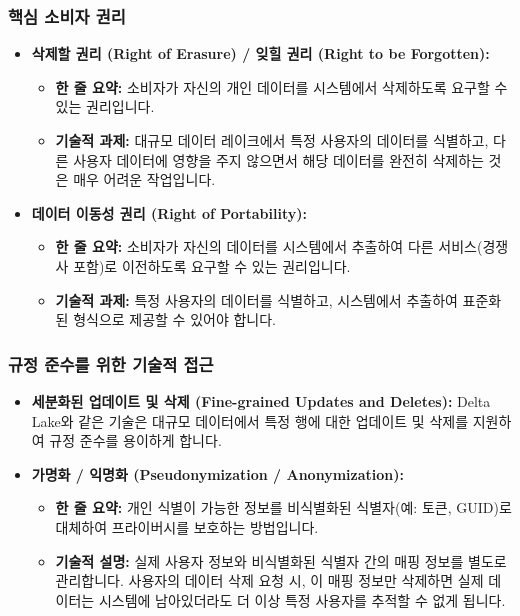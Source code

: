 \documentclass[11pt,a4paper]{article}
\theoremstyle{definition}
\begin{document}
\subsubsection{핵심 소비자 권리}
\begin{itemize}
    \item \textbf{삭제할 권리 (Right of Erasure) / 잊힐 권리 (Right to be Forgotten):}
    \begin{itemize}
        \item \textbf{한 줄 요약:} 소비자가 자신의 개인 데이터를 시스템에서 삭제하도록 요구할 수 있는 권리입니다.
        \item \textbf{기술적 과제:} 대규모 데이터 레이크에서 특정 사용자의 데이터를 식별하고, 다른 사용자 데이터에 영향을 주지 않으면서 해당 데이터를 완전히 삭제하는 것은 매우 어려운 작업입니다.
    \end{itemize}
    \item \textbf{데이터 이동성 권리 (Right of Portability):}
    \begin{itemize}
        \item \textbf{한 줄 요약:} 소비자가 자신의 데이터를 시스템에서 추출하여 다른 서비스(경쟁사 포함)로 이전하도록 요구할 수 있는 권리입니다.
        \item \textbf{기술적 과제:} 특정 사용자의 데이터를 식별하고, 시스템에서 추출하여 표준화된 형식으로 제공할 수 있어야 합니다.
    \end{itemize}
\end{itemize}

\subsubsection{규정 준수를 위한 기술적 접근}
\begin{itemize}
    \item \textbf{세분화된 업데이트 및 삭제 (Fine-grained Updates and Deletes):} Delta Lake와 같은 기술은 대규모 데이터에서 특정 행에 대한 업데이트 및 삭제를 지원하여 규정 준수를 용이하게 합니다.
    \item \textbf{가명화 / 익명화 (Pseudonymization / Anonymization):}
    \begin{itemize}
        \item \textbf{한 줄 요약:} 개인 식별이 가능한 정보를 비식별화된 식별자(예: 토큰, GUID)로 대체하여 프라이버시를 보호하는 방법입니다.
        \item \textbf{기술적 설명:} 실제 사용자 정보와 비식별화된 식별자 간의 매핑 정보를 별도로 관리합니다. 사용자의 데이터 삭제 요청 시, 이 매핑 정보만 삭제하면 실제 데이터는 시스템에 남아있더라도 더 이상 특정 사용자를 추적할 수 없게 됩니다.
    \end{itemize}
\end{itemize}
\end{document}
